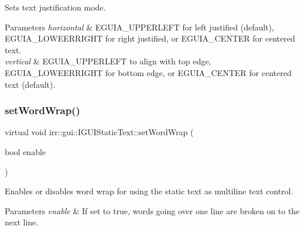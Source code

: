 Sets text justification mode. 


\begin{DoxyParams}{Parameters}
{\em horizontal} & E\+G\+U\+I\+A\+\_\+\+U\+P\+P\+E\+R\+L\+E\+FT for left justified (default), E\+G\+U\+I\+A\+\_\+\+L\+O\+W\+E\+E\+R\+R\+I\+G\+HT for right justified, or E\+G\+U\+I\+A\+\_\+\+C\+E\+N\+T\+ER for centered text. \\
\hline
{\em vertical} & E\+G\+U\+I\+A\+\_\+\+U\+P\+P\+E\+R\+L\+E\+FT to align with top edge, E\+G\+U\+I\+A\+\_\+\+L\+O\+W\+E\+E\+R\+R\+I\+G\+HT for bottom edge, or E\+G\+U\+I\+A\+\_\+\+C\+E\+N\+T\+ER for centered text (default). \\
\hline
\end{DoxyParams}
\mbox{\label{classirr_1_1gui_1_1IGUIStaticText_a2a47bc2f85ced3efc1d007c5bd61f906}} 
\subsubsection{\texorpdfstring{set\+Word\+Wrap()}{setWordWrap()}\hspace{0.1cm}{\footnotesize\ttfamily [1/2]}}
{\footnotesize\ttfamily virtual void irr\+::gui\+::\+I\+G\+U\+I\+Static\+Text\+::set\+Word\+Wrap (\begin{DoxyParamCaption}\item[{bool}]{enable }\end{DoxyParamCaption})\hspace{0.3cm}{\ttfamily [pure virtual]}}



Enables or disables word wrap for using the static text as multiline text control. 


\begin{DoxyParams}{Parameters}
{\em enable} & If set to true, words going over one line are broken on to the next line. \\
\hline
\end{DoxyParams}
\mbox{\label{classirr_1_1gui_1_1IGUIStaticText_a2a47bc2f85ced3efc1d007c5bd61f906}} 
